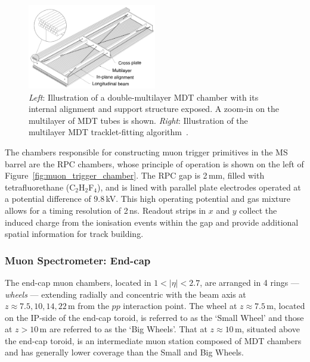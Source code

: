 \begin{figure}[!htb]
    \begin{center}
        \includegraphics[width=0.5\textwidth]{figures/chapter2/muon_spec/mdt_chamber}
        \caption{
            \textit{Left}: Illustration of a double-multilayer MDT chamber with its internal alignment
                and support structure exposed. A zoom-in on the multilayer of MDT tubes is shown.
            \textit{Right}: Illustration of the multilayer MDT tracklet-fitting algorithm~\cite{MDTtrackfit}.
        }
        \label{fig:mdt_chamber}
    \end{center}
\end{figure}

The chambers responsible for constructing muon trigger primitives in the MS barrel
are the RPC chambers, whose principle of operation is shown on the left of Figure~\ref{fig:muon_trigger_chamber}. 
The RPC gap is 2\,mm, filled with tetrafluorethane (C$_2$H$_2$F$_4$), and is lined with
parallel plate electrodes operated at a potential difference of 9.8\,kV. This high operating
potential and gas mixture allows for a timing resolution of 2\,ns. Readout strips in $x$ and $y$
collect the induced charge from the ionisation events within the gap and provide
additional spatial information for track building.

\subsubsection{Muon Spectrometer: End-cap}
\label{sec:ms_endcap}

The end-cap muon chambers, located in $1 < \lvert \eta \rvert < 2.7$, are arranged
in 4 rings --- \textit{wheels} ---  extending radially and concentric with the beam axis at $z \approx 7.5, 10, 14, 22$\,m
from the $pp$ interaction point.
The wheel at $z\approx 7.5$\,m, located on the IP-side of the end-cap toroid, is referred to as the `Small Wheel' and those at $z>10$\,m are
referred to as the `Big Wheels'.
That at $z\approx 10$\,m, situated above the end-cap toroid, is an intermediate muon station composed of MDT chambers and has generally lower coverage than the
Small and Big Wheels.

